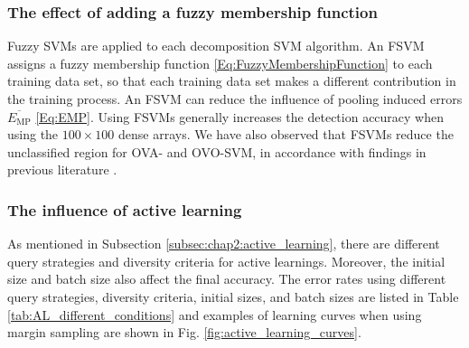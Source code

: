 \subsubsection{The effect of adding a fuzzy membership function}
Fuzzy SVMs are applied to each decomposition SVM algorithm. 
An FSVM assigns a fuzzy membership function \eqref{Eq:FuzzyMembershipFunction} to each training data set, so that each training data set makes a different contribution in the training process. An FSVM can reduce the influence of pooling induced errors  $\overline{E_{\text{MP}}}$ \eqref{Eq:EMP}.  
Using FSVMs generally increases the detection accuracy when using the $100 \times 100$ dense arrays. We have also observed that FSVMs reduce the unclassified region for OVA- and OVO-SVM, in accordance with findings in previous literature \cite{abe2002fuzzy, inoue2001fuzzy}. 



\subsubsection{The influence of active learning}
As mentioned in Subsection \ref{subsec:chap2:active_learning}, there are different query strategies and diversity criteria for active learnings. Moreover, the initial size and batch size also affect the final accuracy. The error rates using different query strategies, diversity criteria, initial sizes, and batch sizes are listed in Table \ref{tab:AL_different_conditions} and examples of learning curves when using margin sampling are shown in Fig. \ref{fig:active_learning_curves}.


